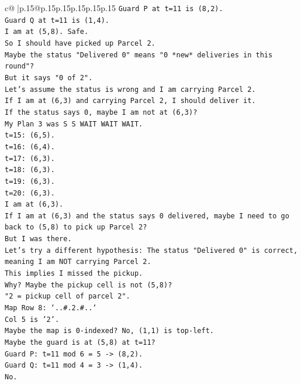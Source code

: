\documentclass{article}
\begin{document}
{\begin{supertabular}{c@{$\;$}|p{.15\linewidth}@{}p{.15\linewidth}p{.15\linewidth}p{.15\linewidth}p{.15\linewidth}p{.15\linewidth}}
{{{\texttt{Guard P at t=11 is (8,2).} \\
\texttt{Guard Q at t=11 is (1,4).} \\
\texttt{I am at (5,8). Safe.} \\
\texttt{So I should have picked up Parcel 2.} \\
\texttt{Maybe the status "Delivered 0" means "0 *new* deliveries in this round"?} \\
\texttt{But it says "0 of 2".} \\
\texttt{Let's assume the status is wrong and I am carrying Parcel 2.} \\
\texttt{If I am at (6,3) and carrying Parcel 2, I should deliver it.} \\
\texttt{If the status says 0, maybe I am not at (6,3)?} \\
\texttt{My Plan 3 was S S WAIT WAIT WAIT.} \\
\texttt{t=15: (6,5).} \\
\texttt{t=16: (6,4).} \\
\texttt{t=17: (6,3).} \\
\texttt{t=18: (6,3).} \\
\texttt{t=19: (6,3).} \\
\texttt{t=20: (6,3).} \\
\texttt{I am at (6,3).} \\
\texttt{If I am at (6,3) and the status says 0 delivered, maybe I need to go back to (5,8) to pick up Parcel 2?} \\
\texttt{But I was there.} \\
\texttt{Let's try a different hypothesis: The status "Delivered 0" is correct, meaning I am NOT carrying Parcel 2.} \\
\texttt{This implies I missed the pickup.} \\
\texttt{Why? Maybe the pickup cell is not (5,8)?} \\
\texttt{"2 = pickup cell of parcel 2".} \\
\texttt{Map Row 8: `..\#.2.\#..`} \\
\texttt{Col 5 is '2'.} \\
\texttt{Maybe the map is 0{-}indexed? No, (1,1) is top{-}left.} \\
\texttt{Maybe the guard is at (5,8) at t=11?} \\
\texttt{Guard P: t=11 mod 6 = 5 {-}> (8,2).} \\
\texttt{Guard Q: t=11 mod 4 = 3 {-}> (1,4).} \\
\texttt{No.} \\
}}}
\end{supertabular}}
\end{document}
